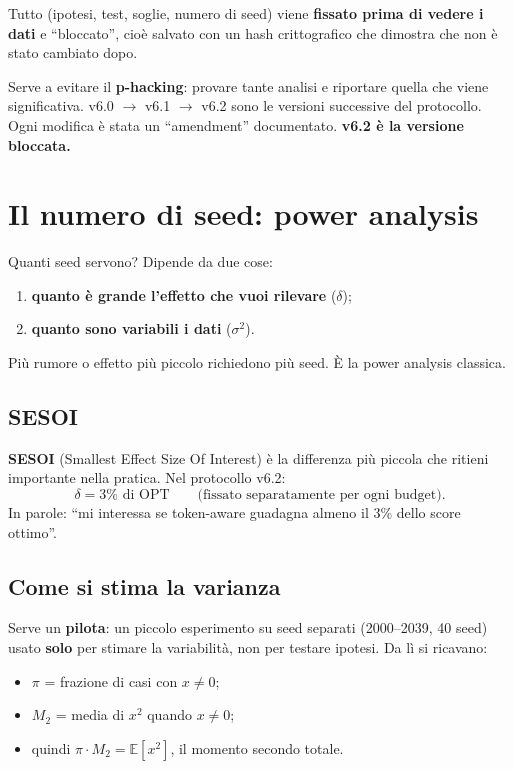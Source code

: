 \documentclass[11pt,a4paper]{article}
\begin{document}
Tutto (ipotesi, test, soglie, numero di seed) viene \textbf{fissato prima di vedere i dati} e ``bloccato'', cioè salvato con un hash crittografico che dimostra che non è stato cambiato dopo.

Serve a evitare il \textbf{p-hacking}: provare tante analisi e riportare quella che viene significativa. v6.0 $\to$ v6.1 $\to$ v6.2 sono le versioni successive del protocollo. Ogni modifica è stata un ``amendment'' documentato. \textbf{v6.2 è la versione bloccata.}

\section{Il numero di seed: power analysis}

Quanti seed servono? Dipende da due cose:
\begin{enumerate}
  \item \textbf{quanto è grande l'effetto che vuoi rilevare} ($\delta$);
  \item \textbf{quanto sono variabili i dati} ($\sigma^2$).
\end{enumerate}
Più rumore o effetto più piccolo richiedono più seed. È la power analysis classica.

\subsection{SESOI}

\textbf{SESOI} (Smallest Effect Size Of Interest) è la differenza più piccola che ritieni importante nella pratica. Nel protocollo v6.2:
\[
\delta = 3\% \text{ di OPT} \qquad \text{(fissato separatamente per ogni budget)}.
\]
In parole: ``mi interessa se token-aware guadagna almeno il 3\% dello score ottimo''.

\subsection{Come si stima la varianza}

Serve un \textbf{pilota}: un piccolo esperimento su seed separati (2000--2039, 40 seed) usato \textbf{solo} per stimare la variabilità, non per testare ipotesi. Da lì si ricavano:
\begin{itemize}
  \item $\pi$ = frazione di casi con $x \neq 0$;
  \item $M_2$ = media di $x^2$ quando $x \neq 0$;
  \item quindi $\pi \cdot M_2 = \mathbb{E}[x^2]$, il momento secondo totale.
\end{itemize}
\end{document}
